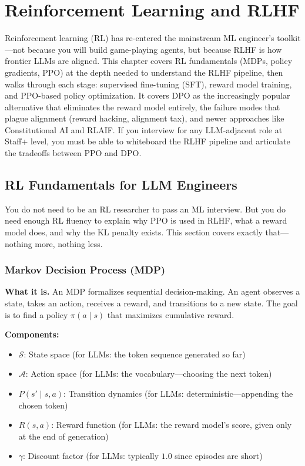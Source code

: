 \chapter{Reinforcement Learning and RLHF}
\label{chap:reinforcement_learning}

\begin{tldr}
Reinforcement learning (RL) has re-entered the mainstream ML engineer's toolkit---not because you will build game-playing agents, but because RLHF is how frontier LLMs are aligned. This chapter covers RL fundamentals (MDPs, policy gradients, PPO) at the depth needed to understand the RLHF pipeline, then walks through each stage: supervised fine-tuning (SFT), reward model training, and PPO-based policy optimization. It covers DPO as the increasingly popular alternative that eliminates the reward model entirely, the failure modes that plague alignment (reward hacking, alignment tax), and newer approaches like Constitutional AI and RLAIF. If you interview for any LLM-adjacent role at Staff+ level, you must be able to whiteboard the RLHF pipeline and articulate the tradeoffs between PPO and DPO.
\end{tldr}

\section{RL Fundamentals for LLM Engineers}
\label{sec:rl_fundamentals}

You do not need to be an RL researcher to pass an ML interview. But you do need enough RL fluency to explain why PPO is used in RLHF, what a reward model does, and why the KL penalty exists. This section covers exactly that---nothing more, nothing less.

\subsection{Markov Decision Process (MDP)}

\textbf{What it is.} An MDP formalizes sequential decision-making. An agent observes a state, takes an action, receives a reward, and transitions to a new state. The goal is to find a policy $\pi(a \mid s)$ that maximizes cumulative reward.

\textbf{Components:}
\begin{itemize}
    \item $\mathcal{S}$: State space (for LLMs: the token sequence generated so far)
    \item $\mathcal{A}$: Action space (for LLMs: the vocabulary---choosing the next token)
    \item $P(s' \mid s, a)$: Transition dynamics (for LLMs: deterministic---appending the chosen token)
    \item $R(s, a)$: Reward function (for LLMs: the reward model's score, given only at the end of generation)
    \item $\gamma$: Discount factor (for LLMs: typically $1.0$ since episodes are short)
\end{itemize}

